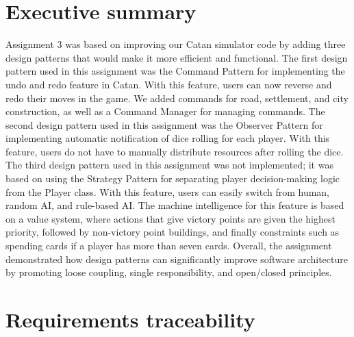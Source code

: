 \section{Executive summary}

Assignment 3 was based on improving our Catan simulator code by adding three design patterns that would make it more efficient and functional. The first design pattern used in this assignment was the Command Pattern for implementing the undo and redo feature in Catan. With this feature, users can now reverse and redo their moves in the game. We added commands for road, settlement, and city construction, as well as a Command Manager for managing commands. The second design pattern used in this assignment was the Observer Pattern for implementing automatic notification of dice rolling for each player. With this feature, users do not have to manually distribute resources after rolling the dice. The third design pattern used in this assignment was not implemented; it was based on using the Strategy Pattern for separating player decision-making logic from the Player class. With this feature, users can easily switch from human, random AI, and rule-based AI. The machine intelligence for this feature is based on a value system, where actions that give victory points are given the highest priority, followed by non-victory point buildings, and finally constraints such as spending cards if a player has more than seven cards. Overall, the assignment demonstrated how design patterns can significantly improve software architecture by promoting loose coupling, single responsibility, and open/closed principles.

\section{Requirements traceability}

